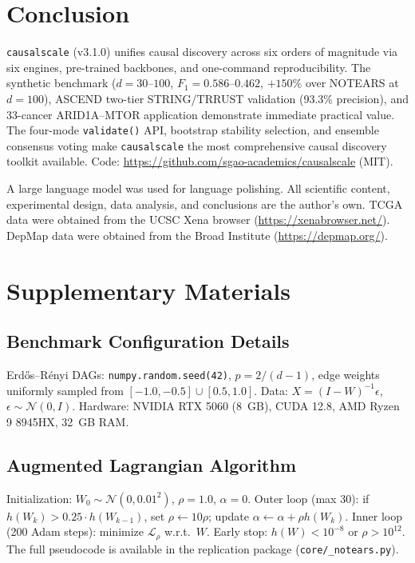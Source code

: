 \documentclass[sigconf,review]{acmart}
\begin{document}
\section{Conclusion}

\texttt{causalscale} (v3.1.0) unifies causal discovery across six orders of magnitude via six engines, pre-trained backbones, and one-command reproducibility. The synthetic benchmark ($d{=}30$--$100$, $F_1{=}0.586$--$0.462$, $+150\%$ over NOTEARS at $d{=}100$), ASCEND two-tier STRING/TRRUST validation (93.3\% precision), and 33-cancer ARID1A--MTOR application demonstrate immediate practical value. The four-mode \texttt{validate()} API, bootstrap stability selection, and ensemble consensus voting make \texttt{causalscale} the most comprehensive causal discovery toolkit available. Code: \url{https://github.com/sgao-academics/causalscale} (MIT).

\begin{acks}
A large language model was used for language polishing. All scientific content, experimental design, data analysis, and conclusions are the author's own. TCGA data were obtained from the UCSC Xena browser (\url{https://xenabrowser.net/}). DepMap data were obtained from the Broad Institute (\url{https://depmap.org/}).
\end{acks}




\clearpage
\appendix
\section{Supplementary Materials}

\subsection{Benchmark Configuration Details}
Erd\H{o}s--R\'{e}nyi DAGs: \texttt{numpy.random.seed(42)}, $p=2/(d-1)$, edge weights uniformly sampled from $[-1.0,-0.5]\cup[0.5,1.0]$. Data: $X=(I-W)^{-1}\epsilon$, $\epsilon\sim\mathcal{N}(0,I)$. Hardware: NVIDIA RTX 5060 (8~GB), CUDA 12.8, AMD Ryzen 9 8945HX, 32~GB RAM.

\subsection{Augmented Lagrangian Algorithm}
Initialization: $W_0\sim\mathcal{N}(0,0.01^2)$, $\rho=1.0$, $\alpha=0$. Outer loop (max 30): if $h(W_k)>0.25\cdot h(W_{k-1})$, set $\rho\leftarrow10\rho$; update $\alpha\leftarrow\alpha+\rho h(W_k)$. Inner loop (200 Adam steps): minimize $\mathcal{L}_\rho$ w.r.t.~$W$. Early stop: $h(W)<10^{-8}$ or $\rho>10^{12}$. The full pseudocode is available in the replication package (\texttt{core/\_notears.py}).
\end{document}
